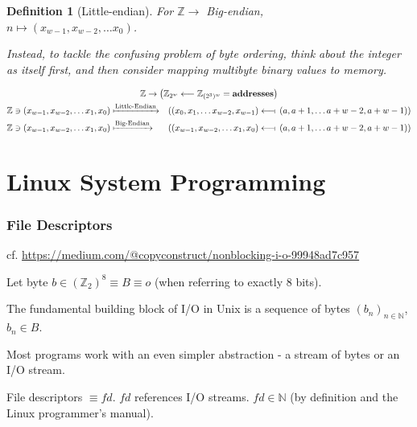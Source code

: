 \documentclass[10pt]{amsart}
\newtheorem{definition}{Definition}
\begin{document}
\begin{multicols*}{2}
\begin{definition}[Little-endian]
For $\mathbb{Z} \to $ Big-endian, \\
$n \mapsto (x_{w-1}, x_{w-2}, \dots x_0)$.

Instead, to tackle the confusing problem of byte ordering, think about the integer as itself first, and then consider \emph{mapping multibyte binary values to memory}.

\begin{equation}
\begin{gathered}
\mathbb{Z} \to \left( \mathbb{Z}_{2^w} \longleftarrow \mathbb{Z}_{(2^3)^w} = \textbf{addresses}  \right) \\
\begin{aligned}
& \mathbb{Z} \ni (x_{w-1}, x_{w-2}, \dots x_1, x_0) \xmapsto{\text{Little-Endian}}  & \left((x_0, x_1 , \dots x_{w-2}, x_{w-1}) \longleftarrow\!\shortmid \,  (a, a+1, \dots a + w-2, a+w-1)\right) \\
& \mathbb{Z} \ni (x_{w-1}, x_{w-2}, \dots x_1, x_0) \xmapsto{\text{Big-Endian}}  & \left((x_{w-1}, x_{w-2} , \dots x_{1}, x_{0}) \longleftarrow\!\shortmid \,  (a, a+1, \dots a + w-2, a+w-1)\right) 
\end{aligned}
\end{gathered}
\end{equation}

 
	
\end{definition}

\part{Linux System Programming}

\section{File Descriptors}

cf. \url{https://medium.com/@copyconstruct/nonblocking-i-o-99948ad7c957}

Let byte $b \in (\mathbb{Z}_2)^8 \equiv B \equiv o$ (when referring to exactly 8 bits).

The fundamental building block of I/O in Unix is a sequence of bytes $(b_n)_{n\in \mathbb{N}}$, $b_n \in B$. 

Most programs work with an even simpler abstraction - a stream of bytes or an I/O stream.

File descriptors $\equiv fd$. $fd$ references I/O streams.  $fd \in \mathbb{N}$ (by definition and the Linux programmer's manual).


\end{multicols*}
\end{document}

